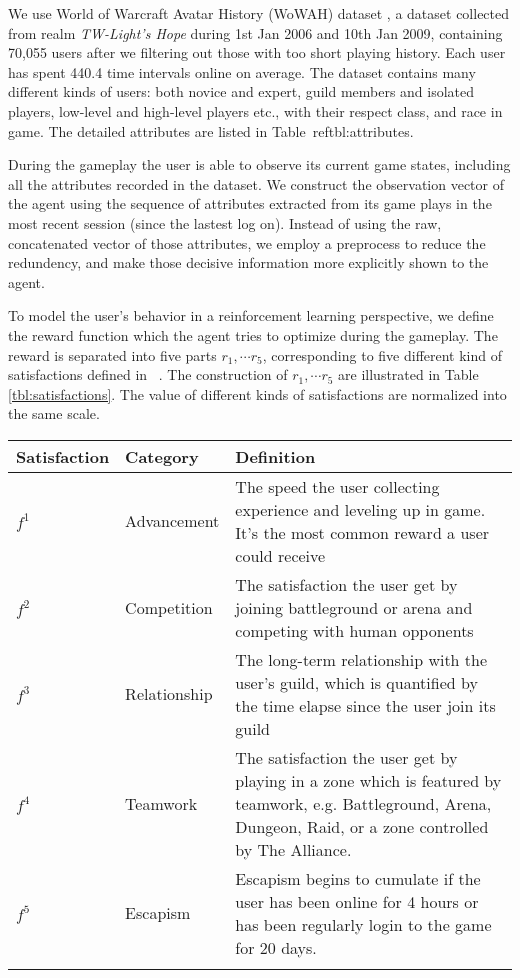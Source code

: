 \documentclass[a4paper]{article}
\begin{document}
We use World of Warcraft Avatar History (WoWAH) dataset \cite{}, a dataset collected from realm \textit{TW-Light's Hope} during 1st Jan 2006 and 10th Jan 2009, containing 70,055 users after we filtering out those with too short playing history. Each user has spent 440.4 time intervals online on average. The dataset contains many different kinds of users: both novice and expert, guild members and isolated players, low-level and high-level players etc., with their respect class, and race in game. The detailed attributes are listed in Table~ref{tbl:attributes}.

During the gameplay the user is able to observe its current game states, including all the attributes recorded in the dataset. We construct the observation vector of the agent using the sequence of attributes extracted from its game plays in the most recent session (since the lastest log on). Instead of using the raw, concatenated vector of those attributes, we employ a preprocess to reduce the redundency, and make those decisive information more explicitly shown to the agent.

To model the user's behavior in a reinforcement learning perspective, we define the reward function which the agent tries to optimize during the gameplay. The reward is separated into five parts $r_1,\cdots r_5$, corresponding to five different kind of satisfactions defined in ~\cite{}. The construction of $r_1,\cdots r_5$ are illustrated in Table \ref{tbl:satisfactions}. The value of different kinds of satisfactions are normalized into the same scale.
\vspace{1cm}


\begin{tabular}{llp{4.8cm}}
    \toprule
    Satisfaction & Category & Definition \\
    \midrule
    $f^1$ & Advancement & The speed the user collecting experience and leveling up in game. It's the most common reward a user could receive \\
    $f^2$ & Competition & The satisfaction the user get by joining battleground or arena and competing with human opponents \\
    $f^3$ & Relationship & The long-term relationship with the user's guild, which is quantified by the time elapse since the user join its guild \\
    $f^4$ & Teamwork & The satisfaction the user get by playing in a zone which is featured by teamwork, e.g. Battleground, Arena, Dungeon, Raid, or a zone controlled by The Alliance. \\
    $f^5$ & Escapism & Escapism begins to cumulate if the user has been online for 4 hours or has been regularly login to the game for 20 days. \\
    \bottomrule
    \label{tbl:satisfactions}
\end{tabular}
\end{document}
